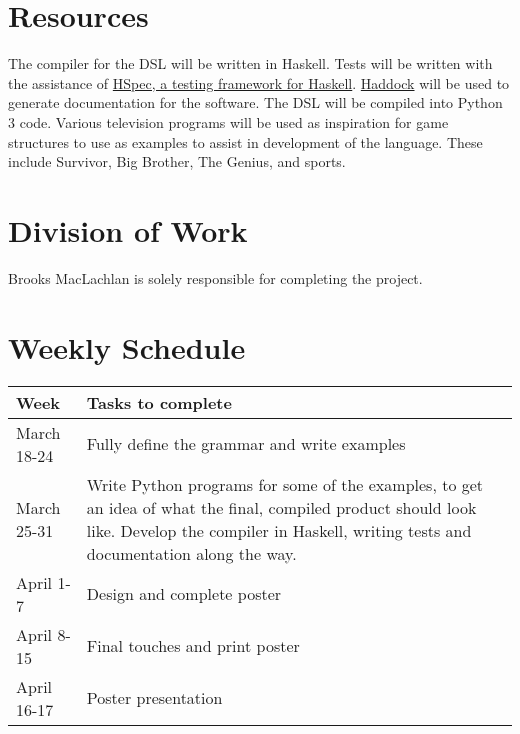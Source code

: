 \documentclass[12pt]{article}
\begin{document}
	\section{Resources}
	
	The compiler for the DSL will be written in Haskell. Tests will be written 
	with the assistance of \href{https://hspec.github.io/}{HSpec, a testing 
	framework for Haskell}. \href{https://www.haskell.org/haddock/}{Haddock} 
	will be used to generate documentation for the software. The DSL will be 
	compiled into Python 3 code. Various television programs will be used as 
	inspiration for game structures to use as examples to assist in development 
	of the language. These include Survivor, Big Brother, The Genius, and 
	sports.
	
	\section{Division of Work}
	
	Brooks MacLachlan is solely responsible for completing the project.
	
	\section{Weekly Schedule}
	
	\begin{tabular}{l p{13cm}}
		\toprule
		Week & Tasks to complete\\
		\midrule
		March 18-24 & Fully define the grammar and write examples\\
		March 25-31 & Write Python programs for some 
		of the examples, to get an idea of what the final, compiled product 
		should look like. Develop the compiler in Haskell, writing tests and 
		documentation along the way.\\
		April 1-7 & Design and complete poster\\
		April 8-15 & Final touches and print poster\\
		April 16-17 & Poster presentation\\
		\bottomrule
	\end{tabular}
	
\end{document}
